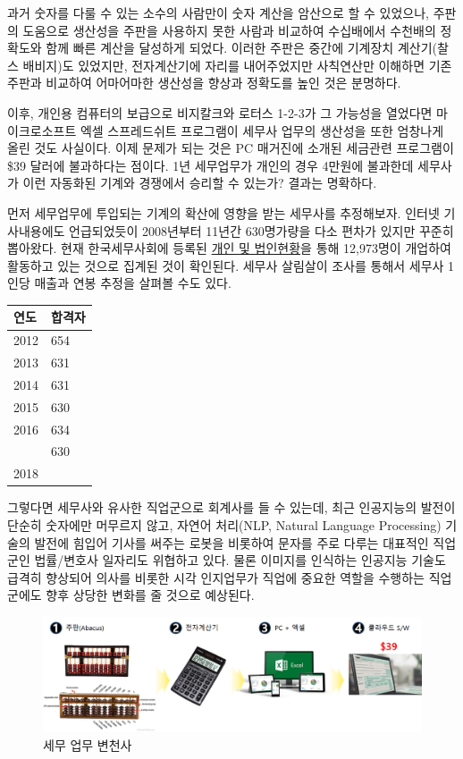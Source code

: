 \documentclass[smallextended]{svjour3}       %
\begin{document}
과거 숫자를 다룰 수 있는 소수의 사람만이 숫자 계산을 암산으로 할 수
있었으나, 주판의 도움으로 생산성을 주판을 사용하지 못한 사람과 비교하여
수십배에서 수천배의 정확도와 함께 빠른 계산을 달성하게 되었다. 이러한
주판은 중간에 기계장치 계산기(찰스 배비지)도 있었지만, 전자계산기에
자리를 내어주었지만 사칙연산만 이해하면 기존 주판과 비교하여 어마어마한
생산성을 향상과 정확도를 높인 것은 분명하다.

이후, 개인용 컴퓨터의 보급으로 비지칼크와 로터스 1-2-3가 그 가능성을
열었다면 마이크로소프트 엑셀 스프레드쉬트 프로그램이 세무사 업무의
생산성을 또한 엄창나게 올린 것도 사실이다. 이제 문제가 되는 것은 PC
매거진\cite{yakal_2020}에 소개된 세금관련 프로그램이 \$39 달러에
불과하다는 점이다. 1년 세무업무가 개인의 경우 4만원에 불과한데 세무사가
이런 자동화된 기계와 경쟁에서 승리할 수 있는가? 결과는 명확하다.

먼저 세무업무에 투입되는 기계의 확산에 영향을 받는 세무사를 추정해보자.
인터넷 기사\cite{tax_2019}내용에도 언급되었듯이 2008년부터 11년간
630명가량을 다소 편차가 있지만 꾸준히 뽑아왔다. 현재 한국세무사회에
등록된 \href{http://www.kacpta.or.kr/}{개인 및 법인현황}을 통해
12,973명이 개업하여 활동하고 있는 것으로 집계된 것이 확인된다. 세무사
살림살이 조사\cite{lim_2018}를 통해서 세무사 1인당 매출과 연봉 추정을
살펴볼 수도 있다.

\begin{tabular}{ll}
\toprule
연도 & 합격자\\
\midrule
2012 & 654\\
2013 & 631\\
2014 & 631\\
2015 & 630\\
2016 & 634\\
\addlinespace
2017 & 630\\
2018 & \\
\bottomrule
\end{tabular}

그렇다면 세무사와 유사한 직업군으로 회계사를 들 수 있는데, 최근
인공지능의 발전이 단순히 숫자에만 머무르지 않고, 자연어 처리(NLP,
Natural Language Processing) 기술의 발전에 힘입어 기사를 써주는 로봇을
비롯하여 문자를 주로 다루는 대표적인 직업군인 법률/변호사 일자리도
위협하고 있다. 물론 이미지를 인식하는 인공지능 기술도 급격히 향상되어
의사를 비롯한 시각 인지업무가 직업에 중요한 역할을 수행하는 직업군에도
향후 상당한 변화를 줄 것으로 예상된다.

\begin{figure}

{\centering \includegraphics[width=1\linewidth]{fig/tax-preparation} 

}

\caption{세무 업무 변천사}\label{fig:unnamed-chunk-1}
\end{figure}
\end{document}
